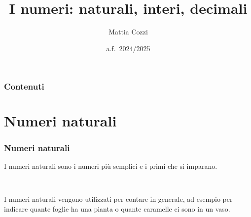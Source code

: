 \documentclass[handout]{beamer}
\title{I numeri: naturali, interi, decimali}
\author{Mattia Cozzi}
\date{a.f.~2024/2025}
\theoremstyle{plain}
\begin{document}
\begin{frame}
  \titlepage
\end{frame}





\begin{frame}
\frametitle{Contenuti}
\tableofcontents
\end{frame}


\section{Numeri naturali}


\begin{frame}
\frametitle{Numeri naturali}
I numeri naturali sono i numeri più semplici e i primi che si imparano.\pause

~

\alert{I numeri naturali vengono utilizzati per contare} in generale, ad esempio per indicare quante foglie ha una pianta o quante caramelle ci sono in un vaso.

~

\end{frame}
\end{document}
